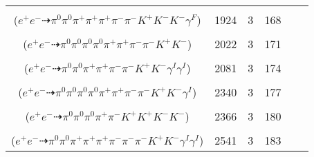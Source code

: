 \documentclass[landscape]{article}
\newcounter{rownumbers}
\newcommand\rn{\stepcounter{rownumbers}\arabic{rownumbers}}
\newcommand{\EOL}{\\} %
\newcommand{\topoTags}[1]{#1} %
\begin{document}
\begin{longtable}{clcccc}
\rn & \makecell[l]{ $ 
e^{+} e^{-} \rightarrow \rho^{+} \rho^{-} K^{+} K^{-} K^{-} K^{*+} ,
\rho^{+} \rightarrow \pi^{0} \pi^{+} ,
\rho^{-} \rightarrow \pi^{0} \pi^{-} ,
K^{*+} \rightarrow \pi^{+} K^{0} ,
K^{0} \rightarrow K_{S}^{0} ,
K_{S}^{0} \rightarrow \pi^{+} \pi^{-} \gamma^{F} 
$ \\ ($
e^{+} e^{-} \dashrightarrow \pi^{0} \pi^{0} \pi^{+} \pi^{+} \pi^{+} \pi^{-} \pi^{-} K^{+} K^{-} K^{-} \gamma^{F} 
$) } & \topoTags{1924 & }3 & 168 \EOL

\rn & \makecell[l]{ $ 
e^{+} e^{-} \rightarrow \pi^{0} \pi^{0} \pi^{+} \rho^{-} \omega K^{+} K^{-} ,
\rho^{-} \rightarrow \pi^{0} \pi^{-} ,
\omega \rightarrow \pi^{0} \pi^{+} \pi^{-} 
$ \\ ($
e^{+} e^{-} \dashrightarrow \pi^{0} \pi^{0} \pi^{0} \pi^{0} \pi^{+} \pi^{+} \pi^{-} \pi^{-} K^{+} K^{-} 
$) } & \topoTags{2022 & }3 & 171 \EOL

\rn & \makecell[l]{ $ 
e^{+} e^{-} \rightarrow \pi^{+} \pi^{-} \rho^{+} \rho^{-} K^{+} K^{-} \gamma^{I} \gamma^{I} ,
\rho^{+} \rightarrow \pi^{0} \pi^{+} ,
\rho^{-} \rightarrow \pi^{0} \pi^{-} 
$ \\ ($
e^{+} e^{-} \dashrightarrow \pi^{0} \pi^{0} \pi^{+} \pi^{+} \pi^{-} \pi^{-} K^{+} K^{-} \gamma^{I} \gamma^{I} 
$) } & \topoTags{2081 & }3 & 174 \EOL

\rn & \makecell[l]{ $ 
e^{+} e^{-} \rightarrow \pi^{0} \pi^{0} \pi^{0} \pi^{+} \pi^{-} \omega K^{+} K^{-} \gamma^{I} ,
\omega \rightarrow \pi^{0} \pi^{+} \pi^{-} 
$ \\ ($
e^{+} e^{-} \dashrightarrow \pi^{0} \pi^{0} \pi^{0} \pi^{0} \pi^{+} \pi^{+} \pi^{-} \pi^{-} K^{+} K^{-} \gamma^{I} 
$) } & \topoTags{2340 & }3 & 177 \EOL

\rn & \makecell[l]{ $ 
e^{+} e^{-} \rightarrow \pi^{0} \pi^{0} \pi^{+} \rho^{-} K^{+} K^{+} K^{-} K^{-} ,
\rho^{-} \rightarrow \pi^{0} \pi^{-} 
$ \\ ($
e^{+} e^{-} \dashrightarrow \pi^{0} \pi^{0} \pi^{0} \pi^{+} \pi^{-} K^{+} K^{+} K^{-} K^{-} 
$) } & \topoTags{2366 & }3 & 180 \EOL

\rn & \makecell[l]{ $ 
e^{+} e^{-} \rightarrow \pi^{0} \pi^{0} \rho^{0} \pi^{+} \pi^{+} \pi^{-} \pi^{-} K^{+} K^{-} \gamma^{I} \gamma^{I} ,
\rho^{0} \rightarrow \pi^{+} \pi^{-} 
$ \\ ($
e^{+} e^{-} \dashrightarrow \pi^{0} \pi^{0} \pi^{+} \pi^{+} \pi^{+} \pi^{-} \pi^{-} \pi^{-} K^{+} K^{-} \gamma^{I} \gamma^{I} 
$) } & \topoTags{2541 & }3 & 183 \EOL


\end{longtable}
\end{document}
